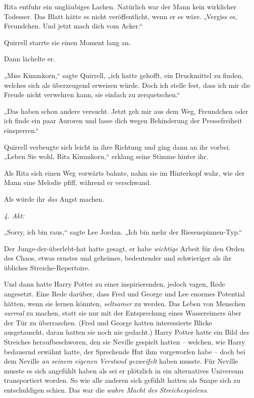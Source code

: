 {Rita entfuhr ein ungläubiges Lachen. Natürlich war der Mann kein wirklicher Todesser. Das Blatt hätte es nicht veröffentlicht, wenn er es wäre. „Vergiss es, Freundchen. Und jetzt mach dich vom Acker.“

Quirrell starrte sie einen Moment lang an.

Dann lächelte er.

„Miss Kimmkorn,“ sagte Quirrell, „ich hatte gehofft, ein Druckmittel zu finden, welches sich als überzeugend erweisen würde. Doch ich stelle fest, dass ich mir die Freude nicht verwehren kann, sie einfach zu zerquetschen.“

„Das haben schon andere versucht. Jetzt geh mir aus dem Weg, Freundchen oder ich finde ein paar Auroren und lasse dich wegen Behinderung der Pressefreiheit einsperren.“

Quirrell verbeugte sich leicht in ihre Richtung und ging dann an ihr vorbei. „Leben Sie wohl, Rita Kimmkorn,“ erklang seine Stimme hinter ihr.

Als Rita sich einen Weg vorwärts bahnte, nahm sie im Hinterkopf wahr, wie der Mann eine Melodie pfiff, während er verschwand.

Als würde ihr \emph{das} Angst machen.

\later

\emph{4. Akt:}

„Sorry, ich bin raus,“ sagte Lee Jordan. „Ich bin mehr der Riesenspinnen-Typ.“

Der Junge-der-überlebt-hat hatte gesagt, er habe \emph{wichtige} Arbeit für den Orden des Chaos, etwas ernstes und geheimes, bedeutender und schwieriger als ihr übliches Streiche-Repertoire.

Und dann hatte Harry Potter zu einer inspirierenden, jedoch vagen, Rede angesetzt. Eine Rede darüber, dass Fred und George und Lee enormes Potential hätten, wenn sie lernen könnten, \emph{seltsamer} zu werden. Das Leben von Menschen \emph{surreal} zu machen, statt sie nur mit der Entsprechung eines Wassereimers über der Tür zu überraschen. (Fred und George hatten interessierte Blicke ausgetauscht, daran hatten sie noch nie gedacht.) Harry Potter hatte ein Bild des Streiches heraufbeschworen, den sie Neville gespielt hatten -- welchen, wie Harry bedauernd erwähnt hatte, der Sprechende Hut ihm vorgeworfen habe -- doch bei dem Neville \emph{an seinem eigenen Verstand gezweifelt} haben musste. Für Neville musste es sich angefühlt haben als sei er plötzlich in ein alternatives Universum transportiert worden. So wie alle anderen sich gefühlt hatten als Snape sich zu entschuldigen schien. Das war die \emph{wahre Macht des Streichespielens.}

}
